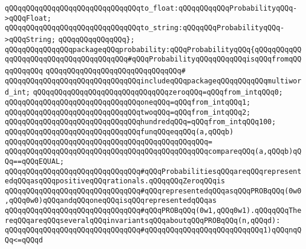 \newline
\verb|qQQqqQQqqQQqqQQqqQQqqQQqqQQqqQQqto_float:qQQqqQQqqQQqProbabilityqQQq->qQQqFloat;|\newline
\verb|qQQqqQQqqQQqqQQqqQQqqQQqqQQqqQQqto_string:qQQqqQQqProbabilityqQQq->qQQqString;|\newline
\newline
\verb|qQQqqQQqqQQqqQQq};|\newline
\newline
\verb|qQQqqQQqqQQqqQQqpackageqQQqprobability:qQQqProbabilityqQQq{qQQqqQQqqQQqqQQqqQQqqQQqqQQqqQQqqQQqqQQq#qQQqProbabilityqQQqqQQqqQQqisqQQqfromqQQqqQQqqQQq|\newline
\verb|qQQqqQQqqQQqqQQqqQQqqQQqqQQqqQQq#|\newline
\verb|qQQqqQQqqQQqqQQqqQQqqQQqqQQqqQQqincludeqQQqpackageqQQqqQQqqQQqmultiword_int;|\newline
\newline
\verb|qQQqqQQqqQQqqQQqqQQqqQQqqQQqqQQqzeroqQQq=qQQqfrom_intqQQq0;|\newline
\verb|qQQqqQQqqQQqqQQqqQQqqQQqqQQqqQQqoneqQQq=qQQqfrom_intqQQq1;|\newline
\verb|qQQqqQQqqQQqqQQqqQQqqQQqqQQqqQQqtwoqQQq=qQQqfrom_intqQQq2;|\newline
\verb|qQQqqQQqqQQqqQQqqQQqqQQqqQQqqQQqhundredqQQq=qQQqfrom_intqQQq100;|\newline
\newline
\verb|qQQqqQQqqQQqqQQqqQQqqQQqqQQqqQQqfunqQQqeqqQQq(a,qQQqb)|\newline
\verb|qQQqqQQqqQQqqQQqqQQqqQQqqQQqqQQqqQQqqQQqqQQqqQQq=|\newline
\verb|qQQqqQQqqQQqqQQqqQQqqQQqqQQqqQQqqQQqqQQqqQQqqQQqcompareqQQq(a,qQQqb)qQQq==qQQqEQUAL;|\newline
\newline
\verb|qQQqqQQqqQQqqQQqqQQqqQQqqQQqqQQq#qQQqProbabilitiesqQQqareqQQqrepresentedqQQqasqQQqpositiveqQQqrationals.qQQqqQQqZeroqQQqis|\newline
\verb|qQQqqQQqqQQqqQQqqQQqqQQqqQQqqQQq#qQQqrepresentedqQQqasqQQqPROBqQQq(0w0,qQQq0w0)qQQqandqQQqoneqQQqisqQQqrepresentedqQQqas|\newline
\verb|qQQqqQQqqQQqqQQqqQQqqQQqqQQqqQQq#qQQqPROBqQQq(0w1,qQQq0w1).qQQqqQQqThereqQQqareqQQqseveralqQQqinvariantsqQQqaboutqQQqPROBqQQq(n,qQQqd):|\newline
\verb|qQQqqQQqqQQqqQQqqQQqqQQqqQQqqQQq#qQQqqQQqqQQqqQQqqQQqqQQqqQQq1)qQQqnqQQq<=qQQqd|\newline
